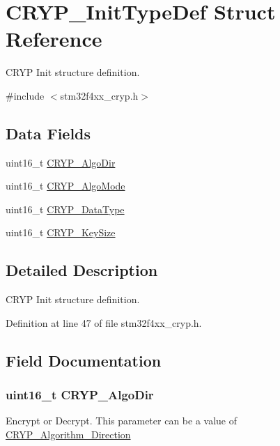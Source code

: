 \hypertarget{struct_c_r_y_p___init_type_def}{\section{C\-R\-Y\-P\-\_\-\-Init\-Type\-Def Struct Reference}
\label{struct_c_r_y_p___init_type_def}
}


C\-R\-Y\-P Init structure definition.  




{\ttfamily \#include $<$stm32f4xx\-\_\-cryp.\-h$>$}

\subsection*{Data Fields}
\begin{DoxyCompactItemize}
\item 
uint16\-\_\-t \hyperlink{struct_c_r_y_p___init_type_def_a185b4501031b0970659f578d9e0d07a1}{C\-R\-Y\-P\-\_\-\-Algo\-Dir}
\item 
uint16\-\_\-t \hyperlink{struct_c_r_y_p___init_type_def_a2f9a49682f1d98503e13d50abf24e00b}{C\-R\-Y\-P\-\_\-\-Algo\-Mode}
\item 
uint16\-\_\-t \hyperlink{struct_c_r_y_p___init_type_def_a1c1633b5c51333cfe587ac87591838b1}{C\-R\-Y\-P\-\_\-\-Data\-Type}
\item 
uint16\-\_\-t \hyperlink{struct_c_r_y_p___init_type_def_a38d9de04f8126b331bca74f8093b8fd7}{C\-R\-Y\-P\-\_\-\-Key\-Size}
\end{DoxyCompactItemize}


\subsection{Detailed Description}
C\-R\-Y\-P Init structure definition. 

Definition at line 47 of file stm32f4xx\-\_\-cryp.\-h.



\subsection{Field Documentation}
\hypertarget{struct_c_r_y_p___init_type_def_a185b4501031b0970659f578d9e0d07a1}{
\subsubsection[{C\-R\-Y\-P\-\_\-\-Algo\-Dir}]{\setlength{\rightskip}{0pt plus 5cm}uint16\-\_\-t C\-R\-Y\-P\-\_\-\-Algo\-Dir}}\label{struct_c_r_y_p___init_type_def_a185b4501031b0970659f578d9e0d07a1}
Encrypt or Decrypt. This parameter can be a value of \hyperlink{group___c_r_y_p___algorithm___direction}{C\-R\-Y\-P\-\_\-\-Algorithm\-\_\-\-Direction} 

